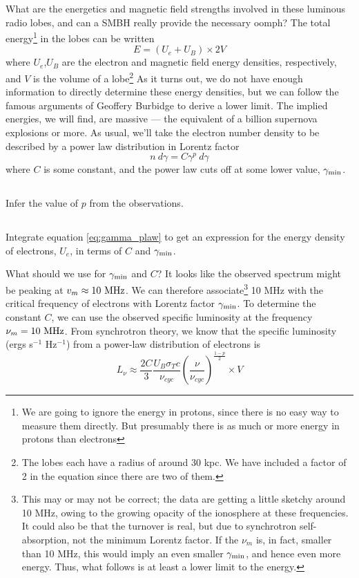 \documentclass[11pt]{article}
\begin{document}
What are the energetics and magnetic field strengths involved in these luminous
radio lobes, and can a SMBH really provide the necessary oomph? The total
energy\footnote{We are going to ignore the energy in protons, since there is no 
easy way to measure them directly. But presumably there is as much or more 
energy in protons than electrons}
in the lobes can be written
\begin{equation}
E=(U_e+U_B)\times 2V
\end{equation}
where $U_e$,$U_B$ are the electron and magnetic field energy densities, respectively,
and $V$ is the volume of a lobe\footnote{The lobes each have a radius of around 30 kpc. 
We have included a factor of 2 in the equation since there are two of them.}
As it turns out, we do not have enough information to directly determine these energy densities, but 
we can follow the famous arguments of Geoffery Burbidge to derive a lower limit. The implied 
energies, we will find, are massive --- the equivalent of a billion supernova explosions or more.
As usual, we’ll take the electron number density to be described by a power law distribution in 
Lorentz factor
\begin{equation}
n~d\gamma=C\gamma^p~d\gamma
\label{eq:gamma_plaw}
\end{equation}
where $C$ is some constant, and the power law cuts off at some lower value, $\gamma_{\rm min}$.

\subsection{}
Infer the value of $p$ from the observations.

\subsection{}
Integrate equation \ref{eq:gamma_plaw} to get an expression for the energy density of
electrons, $U_e$, in terms of $C$ and $\gamma_{\rm min}$.

What should we use for $\gamma_{\rm min}$ and $C$?  It looks like the observed spectrum
might be peaking at $v_m\approx 10~{\rm MHz}$.  We can therefore associate\footnote{
This may or may not be correct; the data are getting a little sketchy around 10 MHz,
owing to the growing opacity of the ionosphere at these frequencies.  It could also
be that the turnover is real, but due to synchrotron self-absorption, not
the minimum Lorentz factor.  If the $\nu_m$ is, in fact, smaller than 10 MHz, this would
imply an even smaller $\gamma_{\rm min}$, and hence even more energy.  Thus, what
follows is at least a lower limit to the energy.}
10 MHz with the critical frequency of electrons with Lorentz factor $\gamma_{\rm min}$.  To
determine the constant $C$, we can use the observed specific luminosity at the frequency
$\nu_m=10~{\rm MHz}$.  From synchrotron theory, we know that the specific luminosity
(ergs s$^{-1}$ Hz$^{-1}$) from a power-law distribution of electrons is
\begin{equation}
L_\nu\approx\frac{2C}3\frac{U_B\sigma_Tc}{\nu_{cyc}}\left(\frac{\nu}{\nu_{cyc}}\right)^\frac{1-p}2\times V
\end{equation}
\end{document}
